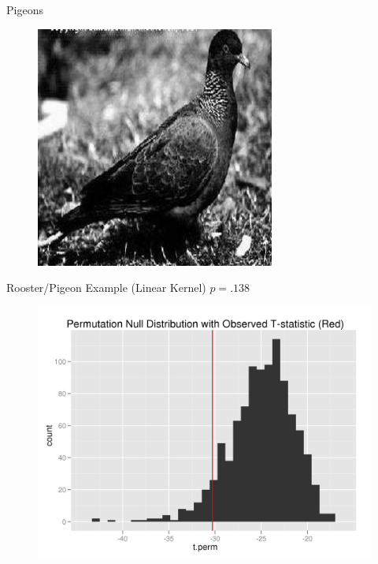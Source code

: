 \documentclass{beamer}
\begin{document}
\begin{frame}{Pigeons}
\begin{figure}
    \includegraphics[scale=.4]{pigeonrs-image_0004.jpg}
  \end{figure}
\end{frame}

\begin{frame}{Rooster/Pigeon Example (Linear Kernel)}
  $p = .138$
  \begin{figure}
    \centering
    \includegraphics[scale=.6]{rooster-pigeon-twosamp.png}
  \end{figure}
\end{frame}
\end{document}
